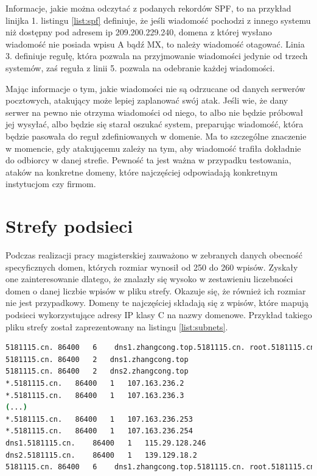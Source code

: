 Informacje, jakie można odczytać z podanych rekordów SPF, to na przykład linijka 1. listingu \ref{list:spf} definiuje, że jeśli
wiadomość pochodzi z innego systemu niż dostępny pod adresem ip 209.200.229.240, domena z której wysłano wiadomość nie posiada
wpisu A bądź MX, to należy wiadomość otagować. Linia 3. definiuje regułę, która pozwala na przyjmowanie wiadomości jedynie od trzech
systemów, zaś reguła z linii 5. pozwala na odebranie każdej wiadomości.

Mając informacje o tym, jakie wiadomości nie są odrzucane od danych serwerów pocztowych, atakujący może lepiej zaplanować swój atak.
Jeśli wie, że dany serwer na pewno nie otrzyma wiadomości od niego, to albo nie będzie próbował jej wysyłać, albo będzie się starał
oszukać system, preparując wiadomość, która będzie pasowała do reguł zdefiniowanych w domenie. Ma to szczególne znaczenie w momencie,
gdy atakującemu zależy na tym, aby wiadomość trafiła dokładnie do odbiorcy w danej strefie. Pewność ta jest ważna w przypadku
testowania, ataków na konkretne domeny, które najczęściej odpowiadają konkretnym instytucjom czy firmom.

\section{Strefy podsieci}
\noindent Podczas realizacji pracy magisterskiej zauważono w zebranych danych obecność specyficznych domen, których rozmiar wynosił od
250 do 260 wpisów. Zyskały one zainteresowanie dlatego, że znalazły się wysoko w zestawieniu liczebności domen o danej liczbie wpisów
w pliku strefy. Okazuje się, że również ich rozmiar nie jest przypadkowy. Domeny te najczęściej składają się z wpisów, które mapują
podsieci wykorzystujące adresy IP klasy C na nazwy domenowe. Przykład takiego pliku strefy został zaprezentowany na
listingu \ref{list:subnets}.

\begin{lstlisting}[label={list:subnets},captionpos=b,caption=Przykład domeny mapującej podsieć.,language=bash]
5181115.cn.	86400	6	 dns1.zhangcong.top.5181115.cn. root.5181115.cn. 1852269423 1852244852 1869660172 74608495 1958743040
5181115.cn.	86400	2	dns1.zhangcong.top
5181115.cn.	86400	2	dns2.zhangcong.top
*.5181115.cn.	86400	1	107.163.236.2
*.5181115.cn.	86400	1	107.163.236.3
(...)
*.5181115.cn.	86400	1	107.163.236.253
*.5181115.cn.	86400	1	107.163.236.254
dns1.5181115.cn.	86400	1	115.29.128.246
dns2.5181115.cn.	86400	1	139.129.18.2
5181115.cn.	86400	6	 dns1.zhangcong.top.5181115.cn. root.5181115.cn. 1 86400 3600 604800 10800
\end{lstlisting}

